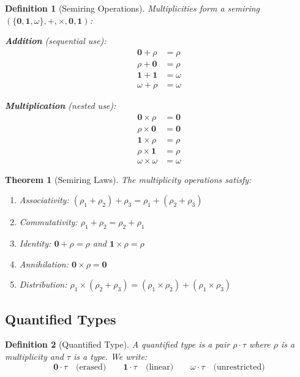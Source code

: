 \documentclass[11pt]{article}
\newtheorem{definition}{Definition}
\newtheorem{theorem}{Theorem}
\newcommand{\mult}{\rho}
\newcommand{\zero}{\mathbf{0}}
\newcommand{\one}{\mathbf{1}}
\newcommand{\many}{\omega}
\begin{document}
\begin{definition}[Semiring Operations]
Multiplicities form a semiring $(\{\zero, \one, \many\}, +, \times, \zero, \one)$:

\textbf{Addition} (sequential use):
\begin{align*}
\zero + \mult &= \mult \\
\mult + \zero &= \mult \\
\one + \one &= \many \\
\many + \mult &= \many
\end{align*}

\textbf{Multiplication} (nested use):
\begin{align*}
\zero \times \mult &= \zero \\
\mult \times \zero &= \zero \\
\one \times \mult &= \mult \\
\mult \times \one &= \mult \\
\many \times \many &= \many
\end{align*}
\end{definition}

\begin{theorem}[Semiring Laws]
The multiplicity operations satisfy:
\begin{enumerate}
\item Associativity: $(\mult_1 + \mult_2) + \mult_3 = \mult_1 + (\mult_2 + \mult_3)$
\item Commutativity: $\mult_1 + \mult_2 = \mult_2 + \mult_1$
\item Identity: $\zero + \mult = \mult$ and $\one \times \mult = \mult$
\item Annihilation: $\zero \times \mult = \zero$
\item Distribution: $\mult_1 \times (\mult_2 + \mult_3) =
      (\mult_1 \times \mult_2) + (\mult_1 \times \mult_3)$
\end{enumerate}
\end{theorem}

\subsection{Quantified Types}

\begin{definition}[Quantified Type]
A quantified type is a pair $\mult \cdot \tau$ where $\mult$ is a multiplicity
and $\tau$ is a type. We write:
\[
\zero \cdot \tau \quad \text{(erased)} \qquad
\one \cdot \tau \quad \text{(linear)} \qquad
\many \cdot \tau \quad \text{(unrestricted)}
\]
\end{definition}
\end{document}
